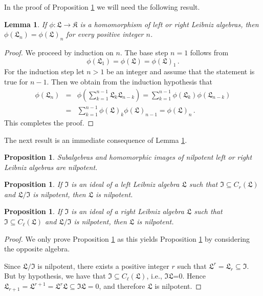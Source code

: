 \documentclass{amsart}
\newtheorem{lem}[thm]{Lemma}
\newtheorem{pro}[thm]{Proposition}
\numberwithin{equation}{section}
\newcommand{\lf}{\mathfrak{L}}
\newcommand{\If}{\mathfrak{I}}
\newcommand{\kf}{\mathfrak{K}}
\begin{document}
In the proof of Proposition \ref{subalghomimnilp} we will need the following result.

\begin{lem}\label{homlowcenser}
If $\phi:\lf\to\kf$ is a homomorphism of left or right Leibniz algebras, then $\phi(\lf_n)=\phi(\lf)_n$
for every positive integer $n$.
\end{lem}

\begin{proof}
We proceed by induction on $n$. The base step $n=1$ follows from $$\phi(\lf_1)=\phi(\lf)=\phi
(\lf)_1\,.$$ For the induction step let $n>1$ be an integer and assume that the statement is true
for $n-1$. Then we obtain from the induction hypothesis that
\begin{eqnarray*}
\phi(\lf_n) & = & \phi(\sum_{k=1}^{n-1}\lf_k\lf_{n-k})=\sum_{k=1}^{n-1}\phi(\lf_k)\phi(\lf_{n-k})\\
& = & \sum_{k=1}^{n-1}\phi(\lf)_k\phi(\lf)_{n-1}=\phi(\lf)_n\,.
\end{eqnarray*}
This completes the proof.
\end{proof}

The next result is an immediate consequence of Lemma \ref{homlowcenser}.

\begin{pro}\label{subalghomimnilp}
Subalgebras and homomorphic images of nilpotent left or right Leibniz algebras are nilpotent.
\end{pro}

\begin{pro}\label{leftextnilp}
If $\If$ is an ideal of a left Leibniz algebra $\lf$ such that $\If\subseteq C_r(\lf)$ and $\lf/\If$ is
nilpotent, then $\lf$ is nilpotent.
\end{pro}

\begin{pro}\label{rightextnilp}
If $\If$ is an ideal of a right Leibniz algebra $\lf$ such that $\If\subseteq C_\ell(\lf)$ and $\lf/\If$
is nilpotent, then $\lf$ is nilpotent.
\end{pro}

\begin{proof}
We only prove Proposition \ref{rightextnilp} as this yields Proposition \ref{leftextnilp} by considering
the opposite algebra.

Since $\lf/\If$ is nilpotent, there exists a positive integer $r$ such that $\lf^r=\lf_r\subseteq\If$.
But by hypothesis, we have that $\If\subseteq C_\ell(\lf)$, i.e., $\If\lf$=0. Hence $\lf_{r+1}=
\lf^{r+1}=\lf^r\lf\subseteq\If\lf=0$, and therefore $\lf$ is nilpotent.
\end{proof}
\end{document}
